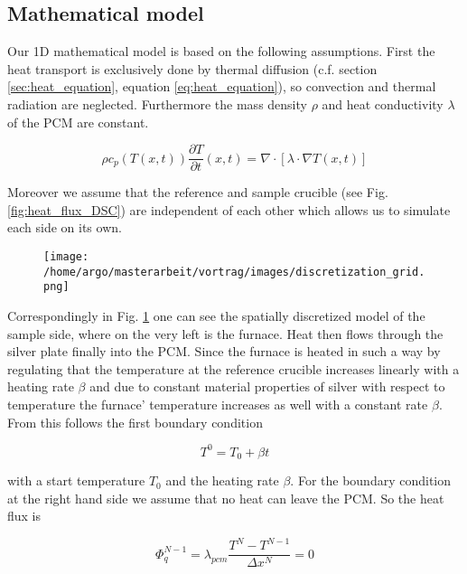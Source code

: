 \documentclass{scrartcl}[12pt, halfparskip]
\begin{document}
\subsection{Mathematical model}

Our 1D mathematical model is based on the following assumptions. First the heat transport is exclusively done by thermal diffusion (c.f. section \ref{sec:heat_equation}, equation \eqref{eq:heat_equation}), so convection and thermal radiation are neglected. Furthermore the mass density $\rho$ and heat conductivity $\lambda$ of the PCM are constant.

\begin{equation}
\rho c_p(T(x,t)) \frac{\partial T}{\partial t}(x,t) = \nabla \cdot \left[\lambda \cdot \nabla T(x,t)  \right]
\label{eq:heat_equation}
\end{equation}

Moreover we assume that the reference and sample crucible (see Fig. \ref{fig:heat_flux_DSC}) are independent of each other which allows us to simulate each side on its own. 

\begin{figure}[H]
	\centering
	\texttt{[image: /home/argo/masterarbeit/vortrag/images/discretization\_grid.png]}
	\caption{}
	\label{fig:mathematical_model_discretized}
\end{figure}

Correspondingly in Fig. \ref{fig:mathematical_model_discretized} one can see the spatially discretized model of the sample side, where on the very left is the furnace. Heat then flows through the silver plate finally into the PCM. Since the furnace is heated in such a way by regulating that the temperature at the reference crucible increases linearly with a heating rate $\beta$ and due to constant material properties of silver with respect to temperature the furnace' temperature increases as well with a constant rate $\beta$. From this follows the first boundary condition

\begin{equation}
	T^0 = T_0 + \beta t
\end{equation}

with a start temperature $T_0$ and the heating rate $\beta$. For the boundary condition at the right hand side we assume that no heat can leave the PCM. So the heat flux is

\begin{equation}
	\Phi_q^{N-1} = \lambda_{pcm} \frac{T^N - T^{N-1}}{\Delta x^N} = 0
\end{equation}
\end{document}
